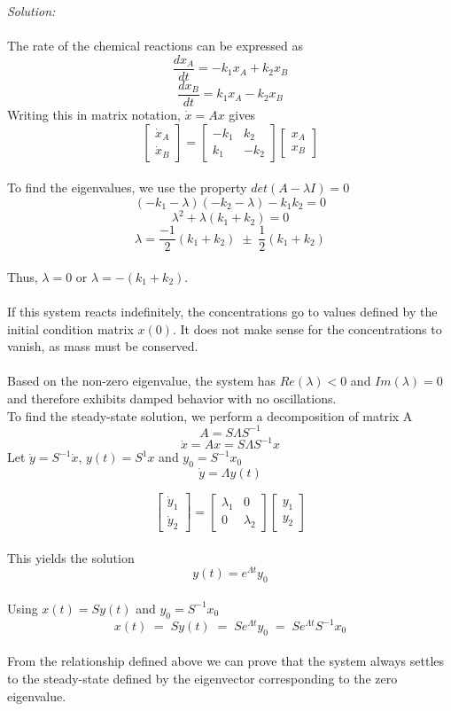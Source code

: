 \documentclass[10pt]{article}
\begin{document}
{\em Solution:}   
\\ \\
The rate of the chemical reactions can be expressed as
\[\frac{dx_A}{dt}=-k_1x_A+k_2x_B \]
\[\frac{dx_B}{dt}=k_1x_A-k_2x_B \]
Writing this in matrix notation, $\dot{x}=Ax$ gives
\[ \left[ \begin{array}{c} \dot{x}_A \\ \dot{x}_B \end{array} \right] = \left[ \begin{array}{cc} -k_1 & k_2 \\ k_1 & -k_2 \end{array} \right] \left[ \begin{array}{c} x_A \\ x_B \end{array} \right] \]
\\
To find the eigenvalues, we use the property $det(A-\lambda I)=0$
\[(-k_1-\lambda)(-k_2-\lambda)-k_1 k_2=0 \]
\[\lambda^2+\lambda(k_1+k_2)=0 \]
\[\lambda=\frac{-1}{2}(k_1+k_2) \;\pm\; \frac{1}{2}(k_1+k_2) \]
\\
Thus, $\lambda=0$ or $\lambda=-(k_1+k_2)$.
\\ \\
If this system reacts indefinitely, the concentrations go to values defined by the initial condition matrix $x(0)$. It does not make sense for the concentrations to vanish, as mass must be conserved. 
\\ \\
Based on the non-zero eigenvalue, the system has $Re(\lambda)<0$ and $Im(\lambda)=0$ and therefore exhibits damped behavior with no oscillations. 
\\
To find the steady-state solution, we perform a decomposition of matrix A
\\
\[A=S \Lambda S^{-1} \]
\[\dot{x}=Ax=S \Lambda S^{-1} x \]
Let $\dot{y}=S^{-1} \dot{x}$, $y(t)=S^{1}x$ and $y_0=S^{-1}x_0$
\[\dot{y}=\Lambda y(t) \]

\[ \left[ \begin{array}{c} \dot{y}_1 \\ \dot{y}_2 \end{array} \right] = \left[ \begin{array}{cc} \lambda_1 & 0 \\ 0 & \lambda_2 \end{array} \right] \left[ \begin{array}{c} y_1 \\ y_2 \end{array} \right] \]
\\
This yields the solution 
\[ y(t)=e^{\Lambda t}y_0 \]
\\
Using $x(t)=Sy(t)$ and $y_0=S^{-1}x_0$
\[x(t) \;=\; Sy(t) \;=\; Se^{\Lambda t}y_0 \;=\; Se^{\Lambda t}S^{-1}x_0 \]
\\
From the relationship defined above we can prove that the system always settles to the steady-state defined by the eigenvector corresponding to the zero eigenvalue. 
\end{document}

